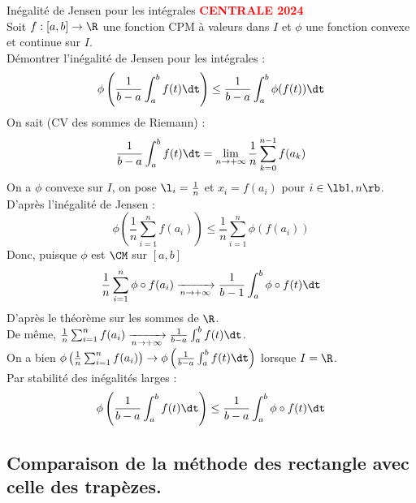 \documentclass[11pt]{article}
\begin{document}
\begin{ex}{Inégalité de Jensen pour les intégrales}{}
    \textcolor{red}{\textbf{CENTRALE 2024}}\\
    Soit $f:[a,b]\to\R$ une fonction CPM à valeurs dans $I$ et $\phi$ une fonction convexe et continue sur $I$.\\
    Démontrer l'inégalité de Jensen pour les intégrales :
    \begin{equation*}
        \phi\left(\frac{1}{b-a}\int_a^bf(t)\dt\right) \leq \frac{1}{b-a}\int_a^b\phi(f(t))\dt
    \end{equation*}
    \tcblower
    On sait (CV des sommes de Riemann) :
    \begin{equation*}
        \frac{1}{b-a}\int_a^bf(t)\dt=\lim_{n\to+\infty}\frac{1}{n}\sum_{k=0}^{n-1}f(a_k)
    \end{equation*}
    On a $\phi$ convexe sur $I$, on pose $\l_i=\frac{1}{n}$ et $x_i=f(a_i)$ pour $i\in\lb1,n\rb$.\\
    D'après l'inégalité de Jensen :
    \begin{equation*}
        \phi\left(\frac{1}{n}\sum_{i=1}^nf(a_i)\right)\leq\frac{1}{n}\sum_{i=1}^n\phi(f(a_i))
    \end{equation*}
    Donc, puisque $\phi$ est $\CM$ sur $[a,b]$
    \begin{equation*}
        \frac{1}{n}\sum_{i=1}^n\phi\circ f(a_i) \xrightarrow[n\to+\infty]{}\frac{1}{b-1}\int_a^b\phi\circ f(t)\dt
    \end{equation*}
    D'après le théorème sur les sommes de $\R$.\\
    De même, $\frac{1}{n}\sum_{i=1}^nf(a_i)\xrightarrow[n\to+\infty]{}\frac{1}{b-a}\int_a^bf(t)\dt$.\\
    On a bien $\phi\left(\frac{1}{n}\sum_{i=1}^nf(a_i)\right)\to\phi\left(\frac{1}{b-a}\int_a^bf(t)\dt\right)$ lorsque $I=\R$.\\
    Par stabilité des inégalités larges :
    \begin{equation*}
        \phi\left(\frac{1}{b-a}\int_a^bf(t)\dt\right)\leq\frac{1}{b-a}\int_a^b\phi\circ f(t)\dt
    \end{equation*}
\end{ex}

\subsection{Comparaison de la méthode des rectangle avec celle des trapèzes.}
\end{document}

